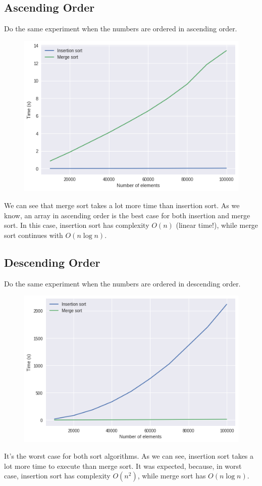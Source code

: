 \documentclass{article}
\begin{document}
\subsection{Ascending Order}
Do the same experiment when the numbers are ordered in ascending order.
  \bigbreak
  \begin{figure}[H]
      \centering
      \includegraphics[scale = 0.8]{Ascending_order}
  \end{figure}
  \bigbreak
  We can see that merge sort takes a lot more time than insertion sort. As we know, an array in ascending order is the best case for both insertion and merge sort. In this case, insertion sort has complexity $O(n)$ (linear time!), while merge sort continues with $O(n\log n)$.
  \bigbreak
\subsection{Descending Order}
Do the same experiment when the numbers are ordered in descending order.
  \bigbreak
  \begin{figure}[H]
      \centering
      \includegraphics[scale = 0.8]{Descending_order}
  \end{figure}
  \bigbreak
  It's the worst case for both sort algorithms. As we can see, insertion sort takes a lot more time to execute than merge sort. It was expected, because, in worst case, insertion sort has complexity $O(n^2)$, while merge sort has $O(n\log n)$.
  \bigbreak
\end{document}

